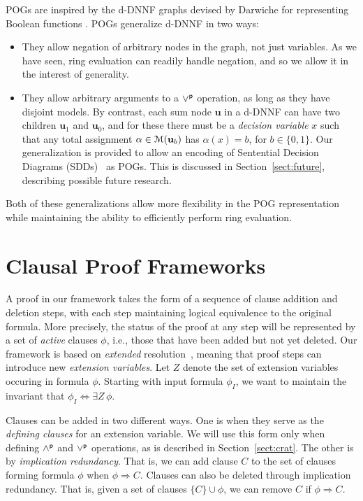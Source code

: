 \documentclass[letterpaper,USenglish,cleveref, autoref, thm-restate]{lipics-v2021}
\newcommand{\pand}{\mathbin{\land^{\sf p}}}
\newcommand{\por}{\mathbin{\lor^{\sf p}}}
\newcommand{\imply}{\Rightarrow}
\newcommand{\ifandonlyif}{\Leftrightarrow}
\newcommand{\assign}{\alpha}
\newcommand{\modelset}{{\cal M}}
\newcommand{\inputformula}{\phi_I}
\newcommand{\makenode}[1]{\mathbf{#1}}
\newcommand{\nodeu}{\makenode{u}}
\begin{document}
POGs are inspired by the d-DNNF graphs devised by Darwiche for
representing Boolean functions \cite{darwiche:jair:2002}.
POGs generalize d-DNNF in two ways:
\begin{itemize}
\item They allow negation of arbitrary nodes in the graph, not just
  variables.  As we have seen, ring evaluation can readily handle negation, and so we allow it in the interest of generality.

\item They allow arbitrary arguments to a $\por$ operation, as long as
  they have disjoint models.  By contrast, each
  sum node $\nodeu$ in a d-DNNF can have two children $\nodeu_1$ and $\nodeu_0$, and for these there must be a {\em decision variable} $x$ such that
  any total assignment $\assign \in  \modelset(\nodeu_b)$ has $\assign(x)=b$, for $b \in \{0,1\}$.
Our generalization is provided to allow an
  encoding of Sentential Decision Diagrams (SDDs)~\cite{darwiche:ijcai:2011} as
  POGs.  This is discussed in Section~\ref{sect:future}, describing possible future research.
\end{itemize}
  Both of these generalizations allow more flexibility in the POG
  representation while maintaining the ability to efficiently perform ring evaluation.

\section{Clausal Proof Frameworks}

A proof in our framework takes the form of a sequence of clause addition
and deletion steps, with each step maintaining logical equivalence to
the original formula.  More precisely, the status of the proof at any step will be represented by
a set of {\em active} clauses $\phi$, i.e., those that
have been added but not yet deleted.  Our framework is based
on {\em extended} resolution~\cite{Tseitin:1983}, meaning that proof
steps can introduce new {\em extension variables}.  Let $Z$
denote the set of extension variables occuring in formula $\phi$.
Starting with input formula $\inputformula$,
we want to maintain the invariant that
$\inputformula \ifandonlyif \exists Z\,\phi$.

Clauses can be added in two different ways.  One is when they serve as
the {\em defining clauses} for an extension variable.  We will use
this form only when defining $\pand$ and $\por$ operations, as is
described in Section~\ref{sect:crat}.  The other is by {\em
  implication redundancy}.  That is, we can add clause $C$ to the set
of clauses forming formula $\phi$ when $\phi \imply C$.  Clauses can
also be deleted through implication redundancy.  That is, given a set
of clauses $\{C\} \cup \phi$, we can remove $C$ if $\phi \imply C$.
\end{document}
